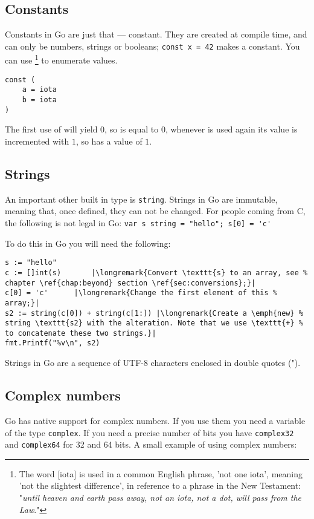 \subsection{Constants}
Constants in Go are just that --- constant. They are created at compile
time, and can only be numbers, strings or booleans;
\lstinline{const x = 42} makes  a constant. You can use
\footnote{The word [iota] is used in a common English phrase,
'not one iota', meaning 'not the slightest difference', in reference to
a phrase in the New Testament: "\emph{until heaven and earth pass away, not an
iota, not a dot, will pass from the Law}."\cite{iota}}
to enumerate values.
\begin{lstlisting}
const (
	a = iota
	b = iota
)
\end{lstlisting}
The first use of  will yield $0$, so  is equal to $0$, whenever
 is used again its value is incremented with $1$, so 
has a value of $1$.

\subsection{Strings}
An important other built in type is \lstinline{string}. Strings in Go are
immutable, meaning that, once defined, they can not be changed. For
people coming from C, the following is not legal in Go:
\lstinline{var s string = "hello"; s[0] = 'c'} 

\noindent{}To do this in Go you will need the following:
\begin{lstlisting}
s := "hello"
c := []int(s)	    |\longremark{Convert \texttt{s} to an array, see %
chapter \ref{chap:beyond} section \ref{sec:conversions};}|
c[0] = 'c'	    |\longremark{Change the first element of this %
array;}|
s2 := string(c[0]) + string(c[1:]) |\longremark{Create a \emph{new} %
string \texttt{s2} with the alteration. Note that we use \texttt{+} %
to concatenate these two strings.}|
fmt.Printf("%v\n", s2)
\end{lstlisting}

\showremarks
Strings in Go are a sequence of UTF-8 characters enclosed in double
quotes (").

\subsection{Complex numbers}
Go has native support for complex numbers. If you 
use them you need a variable of the type \lstinline{complex}. If
you need a precise number of bits you have \lstinline{complex32} and
\lstinline{complex64} for 32 and 64 bits. A small example of using complex numbers:

